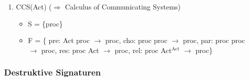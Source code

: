 \documentclass[11pt]{article}
\begin{document}
\begin{enumerate}
\item CCS(Act) ($\Rightarrow$ Calculus of Communicating Systems)
\label{sec-2-5-1-8}
\begin{itemize}
\item S = \{proc\}
\item F = \{ pre: Act \texttimes{} proc $\to$ proc, cho: proc \texttimes{} proc $\to$ proc, par: proc \texttimes{} proc $\to$ proc, res: proc \texttimes{} Act $\to$ proc, rel: proc \texttimes{} Act$^{\text{Act}}$ $\to$ proc\}
\end{itemize}
\end{enumerate}


\subsubsection{Destruktive Signaturen}
\label{sec-2-5-2}
\end{document}
